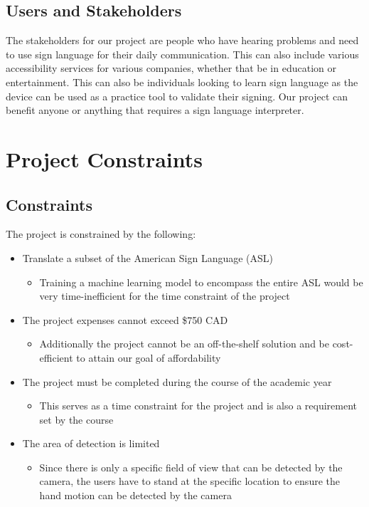 \documentclass[12pt]{article}
\begin{document}
\subsection{Users and Stakeholders}
The stakeholders for our project are people who have hearing problems and need to use sign language for their daily communication. This 
can also include various accessibility services for various companies, whether that be in education or entertainment. This can also be 
individuals looking to learn sign language as the device can be used as a practice tool to validate their signing. Our project can benefit 
anyone or anything that requires a sign language interpreter.\\

\section{Project Constraints}
\subsection{Constraints}
The project is constrained by the following:
\begin{itemize}
  \item Translate a subset of the American Sign Language (ASL)
  \begin{itemize}
    \item Training a machine learning model to encompass the entire ASL would be very time-inefficient for the time constraint of the project
  \end{itemize}
    \item The project expenses cannot exceed \$750 CAD
  \begin{itemize}
    \item Additionally the project cannot be an off-the-shelf solution and be cost-efficient to attain our goal of affordability
  \end{itemize}
  \item The project must be completed during the course of the academic year
  \begin{itemize}
    \item This serves as a time constraint for the project and is also a requirement set by the course
  \end{itemize}
  \item The area of detection is limited
  \begin{itemize}
    \item Since there is only a specific field of view that can be detected by the camera, the users have to stand at the specific location 
    to ensure the hand motion can be detected by the camera
  \end{itemize}
\end{itemize}
\end{document}
